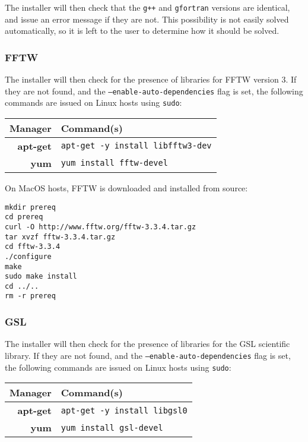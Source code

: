 The installer will then check that the \texttt{g++} and \texttt{gfortran} versions are identical, and issue an error message if they are not.  This possibility is not easily solved automatically, so it is left to the user to determine how it should be solved.

\subsubsection{FFTW}

The installer will then check for the presence of libraries for FFTW version 3.  If they are not found, and the \texttt{--enable-auto-dependencies} flag is set, the following commands are issued on Linux hosts using \texttt{sudo}:

\begin{table}[h]
\begin{tabular}{r|l}
\textbf{Manager} & \textbf{Command(s)} \\ 
\hline
\textbf{apt-get} & \texttt{apt-get -y install libfftw3-dev} \\
\rowcolor[HTML]{C0C0C0} 
\textbf{yum} & \texttt{yum install fftw-devel}
\end{tabular}
\end{table}

\noindent
On MacOS hosts, FFTW is downloaded and installed from source:

\begin{verbatim}
mkdir prereq
cd prereq
curl -O http://www.fftw.org/fftw-3.3.4.tar.gz
tar xvzf fftw-3.3.4.tar.gz
cd fftw-3.3.4
./configure
make
sudo make install
cd ../..
rm -r prereq
\end{verbatim}

\subsubsection{GSL}

The installer will then check for the presence of libraries for the GSL scientific library.  If they are not found, and the \texttt{--enable-auto-dependencies} flag is set, the following commands are issued on Linux hosts using \texttt{sudo}:

\begin{table}[h]
\begin{tabular}{r|l}
\textbf{Manager} & \textbf{Command(s)} \\ 
\hline
\textbf{apt-get} & \texttt{apt-get -y install libgsl0} \\
\rowcolor[HTML]{C0C0C0} 
\textbf{yum} & \texttt{yum install gsl-devel}
\end{tabular}
\end{table}

